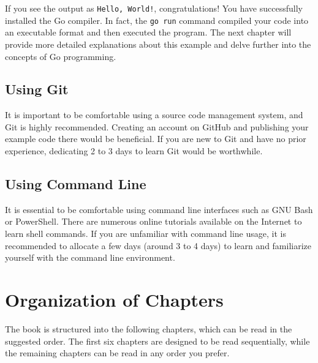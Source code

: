 If you see the output as \texttt{Hello, World!}, congratulations! You have
successfully installed the Go compiler. In fact, the \texttt{go run} command
compiled your code into an executable format and then executed the program. The
next chapter will provide more detailed explanations about this example and
delve further into the concepts of Go programming.

\subsection{Using Git}

It is important to be comfortable using a source code management system, and
Git is highly recommended. Creating an account on GitHub and
publishing your example code there would be beneficial. If you are new to Git
and have no prior experience, dedicating 2 to 3 days to learn Git would be
worthwhile.

\subsection{Using Command Line}

It is essential to be comfortable using command line
interfaces such as GNU Bash or PowerShell. There are numerous online tutorials
available on the Internet to learn shell commands. If you are unfamiliar with
command line usage, it is recommended to allocate a few days (around 3 to 4
days) to learn and familiarize yourself with the command line environment.

\section{Organization of Chapters}

The book is structured into the following chapters, which can be read in the
suggested order. The first six chapters are designed to be read sequentially,
while the remaining chapters can be read in any order you prefer.

